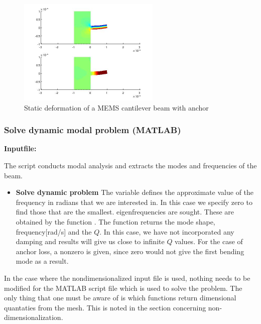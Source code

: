 \begin{figure}[htbp]
\begin{minipage}{0.45\linewidth}
\includegraphics[height = 2in]{fig/mems_cant_wa_m_sta.jpg}
\caption{Static deformation of a MEMS cantilever beam with anchor}
\label{fig:MEMSCantileverBeamWaStatic}
\end{minipage}
\end{figure}



\clearpage
\subsubsection*{Solve dynamic modal problem (MATLAB)}
\begin{flushleft}
  \textbf{Inputfile:}
  \\
\end{flushleft}
\hspace{1in}
{\footnotesize
{}
}

\clearpage
The script conducts modal analysis and extracts the modes and 
frequencies of the beam.

\begin{itemize}

  \item{\textbf{Solve dynamic problem}}
  The variable  defines the approximate value of the frequency 
  in radians that we are interested in. In this case we specify zero to 
  find those that are the smallest.  eigenfrequencies are sought. 
  These are obtained by the function . The function returns 
  the mode shape, frequency[rad/s] and the $Q$. In this case, we have 
  not incorporated any damping and results will give us close to 
  infinite $Q$ values. For the case of anchor loss, a nonzero 
  is given, since zero would not give the first bending mode as a result.

\end{itemize}

In the case where the nondimensionalized input file is used, nothing 
needs to be modified for the MATLAB script file which is used to solve 
the problem. The only thing that one must be aware of is which functions 
return dimensional quantaties from the mesh. This is noted in the section 
concerning non-dimensionalization.

